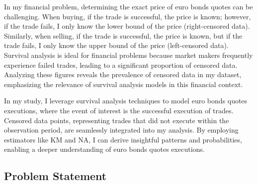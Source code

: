 In my financial problem, determining the exact price of euro bonds quotes can be challenging. When buying, if the trade is successful, the price is known; however, if the trade fails, I only know the lower bound of the price (right-censored data). Similarly, when selling, if the trade is successful, the price is known, but if the trade fails, I only know the upper bound of the price (left-censored data). Survival analysis is ideal for financial problems because market makers frequently experience failed trades, leading to a significant proportion of censored data. Analyzing these figures reveals the prevalence of censored data in my dataset, emphasizing the relevance of survival analysis models in this financial context.

In my study, I leverage survival analysis techniques to model euro bonds quotes executions, where the event of interest is the successful execution of trades. Censored data points, representing trades that did not execute within the observation period, are seamlessly integrated into my analysis. By employing estimators like KM and NA, I can derive insightful patterns and probabilities, enabling a deeper understanding of euro bonds quotes executions.

\subsection{Problem Statement}

